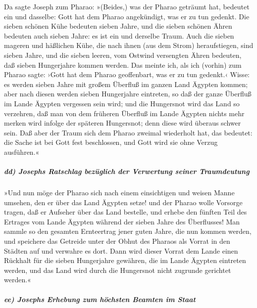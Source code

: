  Da sagte Joseph zum Pharao: »(Beides,) was der Pharao
geträumt hat, bedeutet ein und dasselbe: Gott hat dem Pharao
angekündigt, was er zu tun gedenkt.  Die sieben schönen
Kühe bedeuten sieben Jahre, und die sieben schönen Ähren bedeuten auch
sieben Jahre: es ist ein und derselbe Traum.  Auch die
sieben mageren und häßlichen Kühe, die nach ihnen (aus dem Strom)
heraufstiegen, sind sieben Jahre, und die sieben leeren, vom Ostwind
versengten Ähren bedeuten, daß sieben Hungerjahre kommen werden.
 Das meinte ich, als ich (vorhin) zum Pharao sagte: ›Gott
hat dem Pharao geoffenbart, was er zu tun gedenkt.‹ 
Wisse: es werden sieben Jahre mit großem Überfluß im ganzen Land Ägypten
kommen;  aber nach diesen werden sieben Hungerjahre
eintreten, so daß der ganze Überfluß im Lande Ägypten vergessen sein
wird; und die Hungersnot wird das Land so verzehren,  daß
man von dem früheren Überfluß im Lande Ägypten nichts mehr merken wird
infolge der späteren Hungersnot; denn diese wird überaus schwer sein.
 Daß aber der Traum sich dem Pharao zweimal wiederholt
hat, das bedeutet: die Sache ist bei Gott fest beschlossen, und Gott
wird sie ohne Verzug ausführen.«

\hypertarget{dd-josephs-ratschlag-bezuxfcglich-der-verwertung-seiner-traumdeutung}{%
\subparagraph{dd) Josephs Ratschlag bezüglich der Verwertung seiner
Traumdeutung}\label{dd-josephs-ratschlag-bezuxfcglich-der-verwertung-seiner-traumdeutung}}

 »Und nun möge der Pharao sich nach einem einsichtigen
und weisen Manne umsehen, den er über das Land Ägypten setze!
 und der Pharao wolle Vorsorge tragen, daß er Aufseher
über das Land bestelle, und erhebe den fünften Teil des Ertrages vom
Lande Ägypten während der sieben Jahre des Überflusses! 
Man sammle so den gesamten Ernteertrag jener guten Jahre, die nun kommen
werden, und speichere das Getreide unter der Obhut des Pharaos als
Vorrat in den Städten auf und verwahre es dort.  Dann
wird dieser Vorrat dem Lande einen Rückhalt für die sieben Hungerjahre
gewähren, die im Lande Ägypten eintreten werden, und das Land wird durch
die Hungersnot nicht zugrunde gerichtet werden.«

\hypertarget{ee-josephs-erhebung-zum-huxf6chsten-beamten-im-staat}{%
\subparagraph{ee) Josephs Erhebung zum höchsten Beamten im
Staat}\label{ee-josephs-erhebung-zum-huxf6chsten-beamten-im-staat}}

